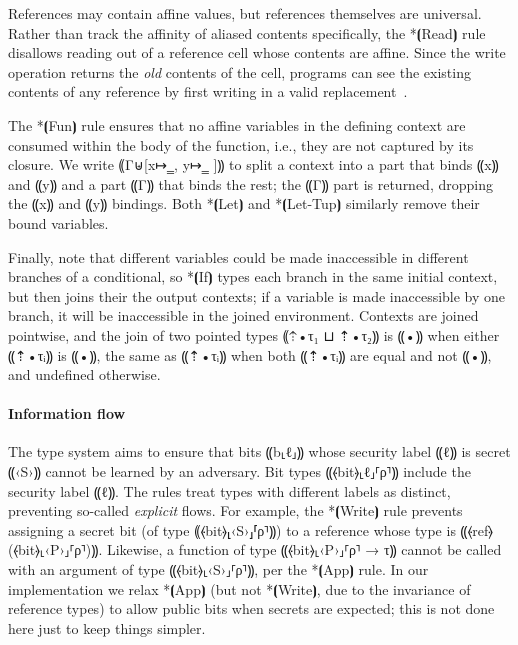 References may contain affine values, but references themselves are
universal. Rather than track the affinity of aliased contents
specifically, the *⦗Read⦘ rule disallows reading out of a reference
cell whose contents are affine. Since the write operation returns the
\emph{old} contents of the cell, programs can see the existing
contents of any reference by first writing in a valid
replacement~\cite{Baker:1992:LLL:142137.142162}.

The *⦗Fun⦘ rule ensures that no affine variables in the defining
context are consumed within the body of the function, i.e., they are
not captured by its closure. We write ⸨Γ⊎[x↦‗, y↦‗ ]⸩ to split a
context into a part that binds ⸨x⸩ and ⸨y⸩ and a part ⸨Γ⸩ that binds the rest;
the ⸨Γ⸩ part is returned, dropping the ⸨x⸩ and ⸨y⸩
bindings. Both *⦗Let⦘ and *⦗Let-Tup⦘ similarly remove their bound
variables.

Finally, note that different variables could be made inaccessible in
different branches of a conditional, so *⦗If⦘ types each branch in the
same initial context, but then joins their the output contexts; if a
variable is made inaccessible by one branch, it will be inaccessible
in the joined environment. Contexts are joined pointwise, and the join of two
pointed types ⸨⇡•τ₁ ⊔ ⇡•τ₂⸩ is ⸨•⸩ when either ⸨⇡•τᵢ⸩ is ⸨•⸩, the same as
⸨⇡•τᵢ⸩ when both ⸨⇡•τᵢ⸩ are equal and not ⸨•⸩, and undefined otherwise.

\paragraph*{Information flow}
%
The type system aims to ensure that bits ⸨b⸤ℓ⸥⸩ whose security label
⸨ℓ⸩ is secret ⸨‹S›⸩ cannot be learned by an adversary. Bit types
⸨⦑bit⦒⸤ℓ⸥⸢ρ⸣⸩ include the security label ⸨ℓ⸩. The rules treat types
with different labels as distinct, preventing so-called \emph{explicit} flows. For
example, the *⦗Write⦘ rule prevents assigning a secret bit (of type
⸨⦑bit⦒⸤‹S›⸥⸢ρ⸣⸩) to a reference whose type is
⸨⦑ref⦒(⦑bit⦒⸤‹P›⸥⸢ρ⸣)⸩. Likewise, a function of type ⸨⦑bit⦒⸤‹P›⸥⸢ρ⸣ →
τ⸩ cannot be called with an argument of type ⸨⦑bit⦒⸤‹S›⸥⸢ρ⸣⸩, per the
*⦗App⦘ rule. In our implementation we relax *⦗App⦘ (but not *⦗Write⦘, due to
the invariance of reference types) to allow public bits
when secrets are expected; this is not done here just to keep things simpler.

